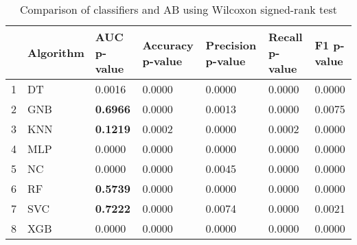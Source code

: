 \begin{table}
\footnotesize
\caption{Comparison of classifiers and AB using Wilcoxon signed-rank test}
\label{tab:wilcoxon comparison}
\begin{tabular}{lllllll}
\hline
 & Algorithm & AUC p-value & Accuracy p-value & Precision p-value & Recall p-value & F1 p-value \\
\hline
1 & DT & 0.0016 & 0.0000 & 0.0000 & 0.0000 & 0.0000 \\
2 & GNB & \textbf{0.6966} & 0.0000 & 0.0013 & 0.0000 & 0.0075 \\
3 & KNN & \textbf{0.1219} & 0.0002 & 0.0000 & 0.0002 & 0.0000 \\
4 & MLP & 0.0000 & 0.0000 & 0.0000 & 0.0000 & 0.0000 \\
5 & NC & 0.0000 & 0.0000 & 0.0045 & 0.0000 & 0.0000 \\
6 & RF & \textbf{0.5739} & 0.0000 & 0.0000 & 0.0000 & 0.0000 \\
7 & SVC & \textbf{0.7222} & 0.0000 & 0.0074 & 0.0000 & 0.0021 \\
8 & XGB & 0.0000 & 0.0000 & 0.0000 & 0.0000 & 0.0000 \\
\hline
\end{tabular}
\end{table}
